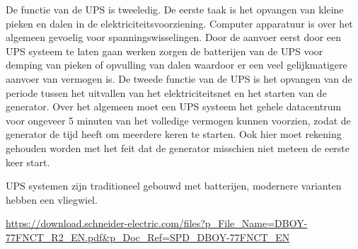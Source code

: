 De functie van de UPS is tweeledig. De eerste taak is het opvangen van kleine pieken en dalen in de elektriciteitsvoorziening. Computer apparatuur is over het algemeen gevoelig voor spanningswisselingen. Door de aanvoer eerst door een UPS systeem te laten gaan werken zorgen de batterijen van de UPS voor demping van pieken of opvulling van dalen waardoor er een veel gelijkmatigere aanvoer van vermogen is. De tweede functie van de UPS is het opvangen van de periode tussen het uitvallen van het elektriciteitsnet en het starten van de generator. Over het algemeen moet een UPS systeem het gehele datacentrum voor ongeveer 5 minuten van het volledige vermogen kunnen voorzien, zodat de generator de tijd heeft om meerdere keren te starten. Ook hier moet rekening gehouden worden met het feit dat de generator misschien niet meteen de eerste keer start.

UPS systemen zijn traditioneel gebouwd met batterijen, modernere varianten hebben een vliegwiel.

\url{https://download.schneider-electric.com/files?p_File_Name=DBOY-77FNCT_R2_EN.pdf&p_Doc_Ref=SPD_DBOY-77FNCT_EN}
